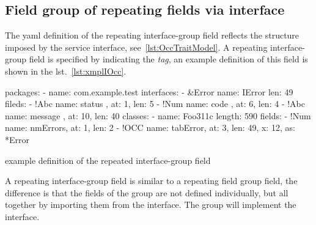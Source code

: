 \subsection{Field group of repeating fields via interface} \label{sub:yaml.iocc}
The yaml definition of the repeating interface-group field reflects the 
structure imposed by the service interface, see~\ref{lst:OccTraitModel}. 
A repeating interface-group field is specified by indicating the 
 \textsl{tag}, an example definition 
of this field is shown in the lst.~\ref{lst:xmplIOcc}.

\begin{elisting}[!htb]
\begin{yamlcode}
packages:
  - name: com.example.test
    interfaces:
      - &Error
        name: IError
        len: 49
        fileds:
          - !Abc { name: status  , at:  1, len:  5}
          - !Num { name: code    , at:  6, len:  4}
          - !Abc { name: message , at: 10, len: 40}
    classes:
      - name: Foo311c
        length: 590
        fields:
          - !Num { name: nmErrors, at: 1, len: 2}
          - !OCC { name: tabError, at: 3, len: 49, x: 12, as: *Error }
\end{yamlcode}
\caption{example definition of the repeated interface-group field}
\label{lst:xmplIOcc}
\end{elisting}
A repeating interface-group field is similar to a repeating field group field, 
the difference is that the fields of the group are not defined individually, but 
all together by importing them from the interface. The group will implement the 
interface.

